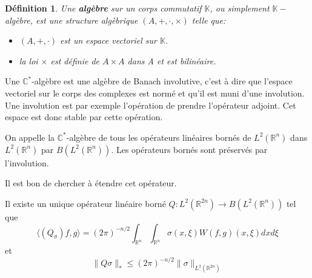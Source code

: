 \documentclass[a4paper, 12pt]{report}
\newcommand{\R}{\mathbb{R}} %
\newcommand{\ra}[1][]{\overset{#1}{\rightarrow}} %
\renewcommand{\.}{\cdot} %
\theoremstyle{break}
\newtheorem{definition}{Définition}
\theoremstyle{remark}
\theoremstyle{proofstyle}
\begin{document}
\begin{definition}
    Une \textbf{algèbre} sur un corps commutatif $\mathbb{K}$, ou simplement $\mathbb{K}-$algèbre, est une structure algèbrique $(A,+, \., \times)$ telle que:
    \begin{itemize}
        \item $(A,+, \.)$ est un espace vectoriel sur $\mathbb{K}$.
        \item la loi $\times$ est définie de $A \times A$ dans A et est bilinéaire.
    \end{itemize}
\end{definition}

Une $\mathbb{C}^*$-algèbre est une algèbre de Banach involutive, c'est à dire que l'espace vectoriel sur le corps des complexes est normé et qu'il est muni d'une involution. Une involution est par exemple l'opération de prendre l'opérateur adjoint. Cet espace est donc stable par cette opération.

On appelle la $\mathbb{C}^*$-algèbre de tous les opérateurs linéaires bornés de $L^2(\R^n)$ dans $L^2(\R^n)$ par $B(L^2(\R^n))$. Les opérateurs bornés sont préservés par l'involution.

Il est bon de chercher à étendre cet opérateur.
\begin{theorem}
    Il existe un unique opérateur linéaire borné $Q : L^2(\R^{2n}) \ra B(L^2(\R^n))$ tel que
    $$\langle ( Q_\sigma)f,g\rangle = (2 \pi)^{-n/2} \int_{\R^n} \int_{\R^n} \sigma(x, \xi) W(f,g)(x, \xi) dx d\xi$$
    et $$\|Q \sigma\|_* \leq (2 \pi)^{-n/2}\|\sigma\|_{L^2(\R^{2n})}$$
\end{theorem}
\end{document}
